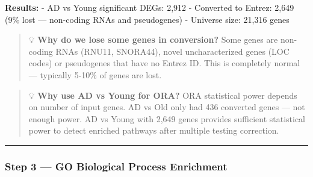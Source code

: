 \documentclass[
]{article}
\newenvironment{Shaded}{\begin{snugshade}}{\end{snugshade}}
\newcommand{\AttributeTok}[1]{\textcolor[rgb]{0.13,0.29,0.53}{#1}}
\newcommand{\ConstantTok}[1]{\textcolor[rgb]{0.56,0.35,0.01}{#1}}
\newcommand{\FloatTok}[1]{\textcolor[rgb]{0.00,0.00,0.81}{#1}}
\newcommand{\FunctionTok}[1]{\textcolor[rgb]{0.13,0.29,0.53}{\textbf{#1}}}
\newcommand{\NormalTok}[1]{#1}
\newcommand{\OtherTok}[1]{\textcolor[rgb]{0.56,0.35,0.01}{#1}}
\newcommand{\SpecialCharTok}[1]{\textcolor[rgb]{0.81,0.36,0.00}{\textbf{#1}}}
\newcommand{\StringTok}[1]{\textcolor[rgb]{0.31,0.60,0.02}{#1}}
\begin{document}
\textbf{Results:} - AD vs Young significant DEGs: 2,912 - Converted to
Entrez: 2,649 (9\% lost --- non-coding RNAs and pseudogenes) - Universe
size: 21,316 genes

\begin{quote}
💡 \textbf{Why do we lose some genes in conversion?} Some genes are
non-coding RNAs (RNU11, SNORA44), novel uncharacterized genes (LOC
codes) or pseudogenes that have no Entrez ID. This is completely normal
--- typically 5-10\% of genes are lost.
\end{quote}

\begin{quote}
💡 \textbf{Why use AD vs Young for ORA?} ORA statistical power depends
on number of input genes. AD vs Old only had 436 converted genes --- not
enough power. AD vs Young with 2,649 genes provides sufficient
statistical power to detect enriched pathways after multiple testing
correction.
\end{quote}

\begin{center}\rule{0.5\linewidth}{0.5pt}\end{center}

\subsubsection{Step 3 --- GO Biological Process
Enrichment}\label{step-3-go-biological-process-enrichment}

\begin{Shaded}
\end{Shaded}
\end{document}
